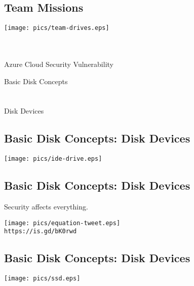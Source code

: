 \documentclass[xga]{xdvislides}
\begin{document}
\subsection{Team Missions}
\vfill
\begin{center}
	\texttt{[image: pics/team-drives.eps]} \\
\end{center}
\hspace*{2.5in}{\bf \textcolor{blue}{Blue Team}} \\
\hspace*{2.5in}{\tt https://is.gd/Tm6IQi} \\
\hspace*{2.5in}Azure Cloud Security Vulnerability
\vfill

\newpage
\vspace*{\fill}
\begin{center}
	\Hugesize
		Basic Disk Concepts \\ [1em]
	\hspace*{5mm}
	\blueline\\
	\hspace*{5mm}\\
		Disk Devices
\end{center}
\vspace*{\fill}


\subsection{Basic Disk Concepts: Disk Devices}
	\begin{center}
		\texttt{[image: pics/ide-drive.eps]} \\
	\end{center}

\subsection{Basic Disk Concepts: Disk Devices}
Security affects everything. \\
\begin{center}
	\texttt{[image: pics/equation-tweet.eps]} \\
	\verb+https://is.gd/bK0rwd+
\end{center}

\subsection{Basic Disk Concepts: Disk Devices}
	\begin{center}
		\texttt{[image: pics/ssd.eps]} \\
	\end{center}
\end{document}
